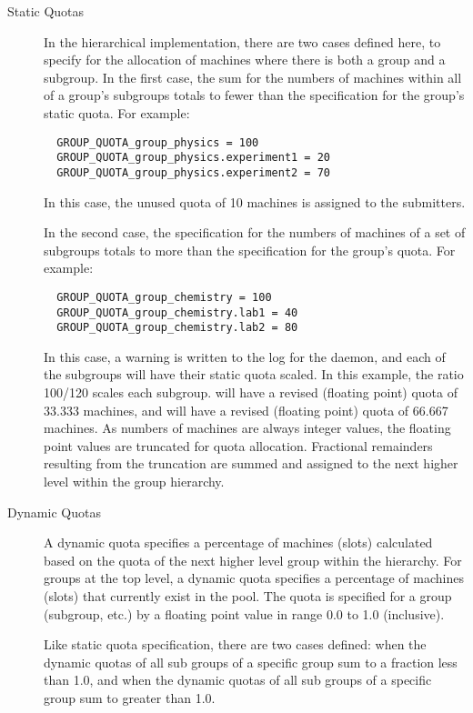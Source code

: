 \begin{description}
\item[Static Quotas]
In the hierarchical implementation,
there are two cases defined here,
to specify for the allocation of machines where
there is both a group and a subgroup.
In the first case, the sum for the numbers of machines
within all of a group's subgroups totals to fewer than the specification for
the group's static quota.
For example:
\begin{verbatim}
  GROUP_QUOTA_group_physics = 100
  GROUP_QUOTA_group_physics.experiment1 = 20
  GROUP_QUOTA_group_physics.experiment2 = 70
\end{verbatim}
In this case, the unused quota of 10 machines is assigned to
the  submitters.  

In the second case, the specification for the numbers of machines
of a set of subgroups totals to more than the specification for
the group's quota.
For example:
\begin{verbatim}
  GROUP_QUOTA_group_chemistry = 100
  GROUP_QUOTA_group_chemistry.lab1 = 40
  GROUP_QUOTA_group_chemistry.lab2 = 80
\end{verbatim}
In this case, 
a warning is written to the log for the  daemon,
and each of the subgroups will have their static quota scaled.
In this example, the ratio 100/120 scales each subgroup.
 will have a revised (floating point) quota of 33.333 machines,
and  will have a revised (floating point) quota of 66.667 machines.
As numbers of machines are always integer values,
the floating point values are truncated for quota allocation.
Fractional remainders resulting from the truncation are summed
and assigned to the next higher level within the group hierarchy.

\item[Dynamic Quotas]
A dynamic quota specifies a percentage of machines (slots) calculated
based on the quota of the next higher level group within the hierarchy.
For groups at the top level, a dynamic quota specifies a percentage of
machines (slots) that currently exist in the pool.
The quota is specified for a group (subgroup, etc.) by a floating point
value in range 0.0 to 1.0 (inclusive).

Like static quota specification, there are two cases defined:
when the dynamic quotas of all sub groups of a specific group
sum to a fraction less than 1.0,
and when the dynamic quotas of all sub groups of a specific group
sum to greater than 1.0.


\end{description}
